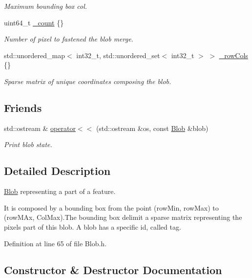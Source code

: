 \begin{DoxyCompactItemize}
\begin{DoxyCompactList}\small\item\em Maximum bounding box col. \end{DoxyCompactList}\item 
uint64\+\_\+t \hyperlink{classfc_1_1Blob_a7a36fdbf8d1c967b0664613f1b7f3a98}{\+\_\+count} \{\}
\begin{DoxyCompactList}\small\item\em Number of pixel to fastened the blob merge. \end{DoxyCompactList}\item 
std\+::unordered\+\_\+map$<$ int32\+\_\+t, std\+::unordered\+\_\+set$<$ int32\+\_\+t $>$ $>$ \hyperlink{classfc_1_1Blob_a2688a4b64b2e3d37e7309aca03177b55}{\+\_\+row\+Cols} \{\}
\begin{DoxyCompactList}\small\item\em Sparse matrix of unique coordinates composing the blob. \end{DoxyCompactList}\end{DoxyCompactItemize}
\subsection*{Friends}
\begin{DoxyCompactItemize}
\item 
std\+::ostream \& \hyperlink{classfc_1_1Blob_a5fe38c43bc6a7886e8760e7b00ade43a}{operator$<$$<$} (std\+::ostream \&os, const \hyperlink{classfc_1_1Blob}{Blob} \&blob)
\begin{DoxyCompactList}\small\item\em Print blob state. \end{DoxyCompactList}\end{DoxyCompactItemize}


\subsection{Detailed Description}
\hyperlink{classfc_1_1Blob}{Blob} representing a part of a feature. 

It is composed by a bounding box from the point (row\+Min, row\+Max) to (row\+M\+Ax, Col\+Max).The bounding box delimit a sparse matrix representing the pixels part of this blob. A blob has a specific id, called tag. 

Definition at line 65 of file Blob.\+h.



\subsection{Constructor \& Destructor Documentation}
\mbox{\label{classfc_1_1Blob_ac52255b13f4ce401de0a4310d846c62a}} 
